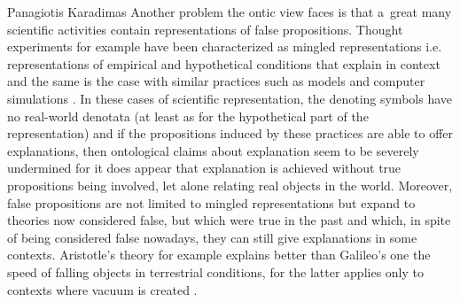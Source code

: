 \begin{artengenv}{Panagiotis Karadimas}
Another problem the ontic view faces is that a~great many scientific activities contain representations of false propositions. Thought experiments for example have been characterized as mingled representations i.e. representations of empirical and hypothetical conditions that explain in context and the same is the case with similar practices such as models and computer simulations
\parencite[][]{karadimas_thought_2022}. %
 In these cases of scientific representation, the denoting symbols have no real-world denotata (at least as for the hypothetical part of the representation) and if the propositions induced by these practices are able to offer explanations, then ontological claims about explanation seem to be severely undermined for it does appear that explanation is achieved without true propositions being involved, let alone relating real objects in the world. Moreover, false propositions are not limited to mingled representations but expand to theories now considered false, but which were true in the past and which, in spite of being considered false nowadays, they can still give explanations in some contexts. Aristotle's theory for example explains better than Galileo's one the speed of falling objects in terrestrial conditions, for the latter applies only to contexts where vacuum is created 
\parencite[][]{rovelli_aristotles_2015}.%



\end{artengenv}

